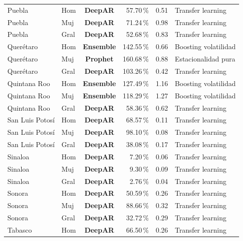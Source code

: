\documentclass[12pt, letterpaper]{article}
\begin{document}
\begin{longtable}{l l >{\bfseries}c r r l}
Puebla & Hom & \textcolor{cdeepar}{\textbf{DeepAR}} & 57.70\,\% & 0.51 & Transfer learning \\
Puebla & Muj & \textcolor{cdeepar}{\textbf{DeepAR}} & 71.24\,\% & 0.98 & Transfer learning \\
Puebla & Gral & \textcolor{cdeepar}{\textbf{DeepAR}} & 52.68\,\% & 0.83 & Transfer learning \\
Querétaro & Hom & \textcolor{censemble}{\textbf{Ensemble}} & 142.55\,\% & 0.66 & Boosting volatilidad \\
Querétaro & Muj & \textcolor{cprophet}{\textbf{Prophet}} & 160.68\,\% & 0.88 & Estacionalidad pura \\
Querétaro & Gral & \textcolor{cdeepar}{\textbf{DeepAR}} & 103.26\,\% & 0.42 & Transfer learning \\
Quintana Roo & Hom & \textcolor{censemble}{\textbf{Ensemble}} & 127.49\,\% & 1.16 & Boosting volatilidad \\
Quintana Roo & Muj & \textcolor{censemble}{\textbf{Ensemble}} & 118.29\,\% & 1.27 & Boosting volatilidad \\
Quintana Roo & Gral & \textcolor{cdeepar}{\textbf{DeepAR}} & 58.36\,\% & 0.62 & Transfer learning \\
San Luis Potosí & Hom & \textcolor{cdeepar}{\textbf{DeepAR}} & 68.57\,\% & 0.11 & Transfer learning \\
San Luis Potosí & Muj & \textcolor{cdeepar}{\textbf{DeepAR}} & 98.10\,\% & 0.08 & Transfer learning \\
San Luis Potosí & Gral & \textcolor{cdeepar}{\textbf{DeepAR}} & 38.08\,\% & 0.17 & Transfer learning \\
Sinaloa & Hom & \textcolor{cdeepar}{\textbf{DeepAR}} & 7.20\,\% & 0.06 & Transfer learning \\
Sinaloa & Muj & \textcolor{cdeepar}{\textbf{DeepAR}} & 9.30\,\% & 0.09 & Transfer learning \\
Sinaloa & Gral & \textcolor{cdeepar}{\textbf{DeepAR}} & 2.76\,\% & 0.04 & Transfer learning \\
Sonora & Hom & \textcolor{cdeepar}{\textbf{DeepAR}} & 50.59\,\% & 0.26 & Transfer learning \\
Sonora & Muj & \textcolor{cdeepar}{\textbf{DeepAR}} & 88.66\,\% & 0.32 & Transfer learning \\
Sonora & Gral & \textcolor{cdeepar}{\textbf{DeepAR}} & 32.72\,\% & 0.29 & Transfer learning \\
Tabasco & Hom & \textcolor{cdeepar}{\textbf{DeepAR}} & 66.50\,\% & 0.26 & Transfer learning \\

\end{longtable}
\end{document}
